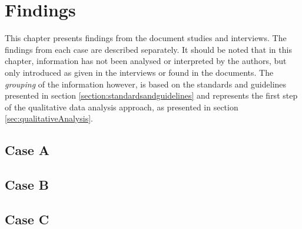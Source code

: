 \chapter{Findings}
\label{chp:findings}
This chapter presents findings from the document studies and interviews. The findings from each case are described separately. It should be noted that in this chapter, information has not been analysed or interpreted by the authors, but only introduced as given in the interviews or found in the documents. The \textit{grouping} of the information however, is based on the standards and guidelines presented in section \ref{section:standardsandguidelines} and represents the first step of the qualitative data analysis approach, as presented in section \ref{sec:qualitativeAnalysis}. 

\section{Case A}


\section{Case B}


\section{Case C}
